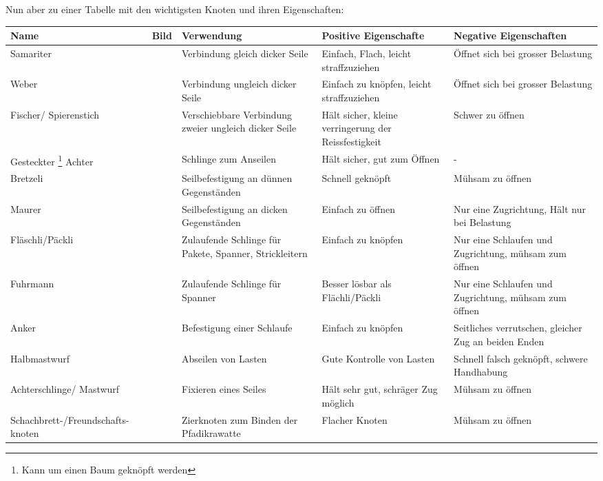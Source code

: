 Nun aber zu einer Tabelle mit den wichtigsten Knoten und ihren Eigenschaften:
\begin{center}
\begin{tabularx}{\textwidth}{X|X|X|X|X}
    \textbf{Name} & \textbf{Bild} & \textbf{Verwendung} & \textbf{Positive Eigenschafte} & \textbf{Negative Eigenschaften} \\\hline
    Samariter & & Verbindung gleich dicker Seile & Einfach, Flach, leicht straffzuziehen & Öffnet sich bei grosser Belastung \\\hline
    Weber & & Verbindung ungleich dicker Seile & Einfach zu knöpfen, leicht straffzuziehen & Öffnet sich bei grosser Belastung\\\hline
    Fischer/ Spierenstich & & Verschiebbare Verbindung zweier ungleich dicker Seile & Hält sicher, kleine verringerung der Reissfestigkeit & Schwer zu öffnen \\\hline
    Gesteckter \footnote{Kann um einen Baum geknöpft werden} Achter& & Schlinge zum Anseilen & Hält sicher, gut zum Öffnen & - \\\hline
    Bretzeli & & Seilbefestigung an dünnen Gegenständen & Schnell geknöpft & Mühsam zu öffnen \\\hline
    Maurer & & Seilbefestigung an dicken Gegenständen & Einfach zu öffnen & Nur eine Zugrichtung, Hält nur bei Belastung \\\hline
    Fläschli/Päckli & & Zulaufende Schlinge für Pakete, Spanner, Strickleitern & Einfach zu knöpfen & Nur eine Schlaufen und Zugrichtung, mühsam zum öffnen \\\hline
    Fuhrmann & & Zulaufende Schlinge für Spanner & Besser lösbar als Flächli/Päckli & Nur eine Schlaufen und Zugrichtung, mühsam zum öffnen \\\hline
    Anker & & Befestigung einer Schlaufe & Einfach zu knöpfen & Seitliches verrutschen, gleicher Zug an beiden Enden \\\hline
    Halbmastwurf & & Abseilen von Lasten & Gute Kontrolle von Lasten & Schnell falsch geknöpft, schwere Handhabung \\\hline
    Achterschlinge/ Mastwurf & & Fixieren eines Seiles & Hält sehr gut, schräger Zug möglich & Mühsam zu öffnen \\\hline
    Schachbrett-/Freundschafts- knoten & & Zierknoten zum Binden der Pfadikrawatte & Flacher Knoten & Mühsam zu öffnen \\
\end{tabularx}
\end{center}

